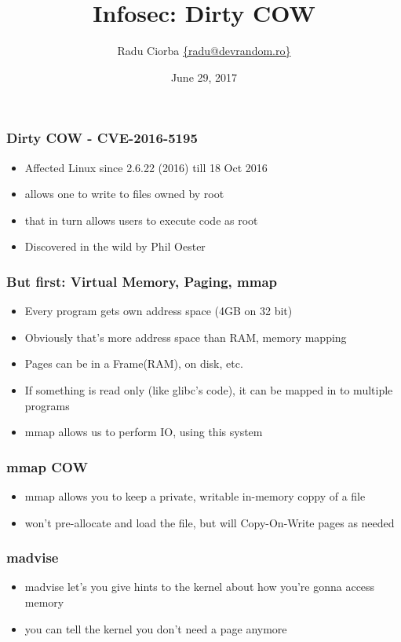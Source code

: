 \documentclass{beamer}
\title[Dirty COW]{Infosec: Dirty COW} %
\author{Radu Ciorba \href{mailto:radu@devrandom.ro}{\{radu@devrandom.ro\}}} %
\date{June 29, 2017} %
\begin{document}
\begin{frame}
  \titlepage %
\end{frame}


\begin{frame}
  \frametitle{Dirty COW - CVE-2016-5195}
  \begin{itemize}
  \item Affected Linux since 2.6.22 (2016) till 18 Oct 2016 
  \item allows one to write to files owned by root
  \item that in turn allows users to execute code as root
  \item Discovered in the wild by Phil Oester
  \end{itemize}
\end{frame}


\begin{frame}
  \frametitle{But first: Virtual Memory, Paging, mmap}
  \begin{itemize}
  \item Every program gets own address space (4GB on 32 bit)
  \item Obviously that's more address space than RAM, memory mapping
  \item Pages can be in a Frame(RAM), on disk, etc.
  \item If something is read only (like glibc's code), it can be mapped in to multiple programs
  \item mmap allows us to perform IO, using this system
  \end{itemize}
\end{frame}

\begin{frame}
  \frametitle{mmap COW}
  \begin{itemize}
  \item mmap allows you to keep a private, writable in-memory coppy of a file
  \item won't pre-allocate and load the file, but will Copy-On-Write pages as needed
  \end{itemize}
\end{frame}

\begin{frame}
  \frametitle{madvise}
  \begin{itemize}
  \item madvise let's you give hints to the kernel about how you're gonna access memory
  \item you can tell the kernel you don't need a page anymore
  \end{itemize}
\end{frame}
\end{document}
